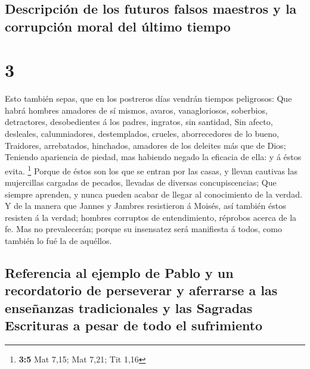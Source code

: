 \hypertarget{descripciuxf3n-de-los-futuros-falsos-maestros-y-la-corrupciuxf3n-moral-del-uxfaltimo-tiempo}{%
\subsection{Descripción de los futuros falsos maestros y la corrupción
moral del último
tiempo}\label{descripciuxf3n-de-los-futuros-falsos-maestros-y-la-corrupciuxf3n-moral-del-uxfaltimo-tiempo}}

\hypertarget{section-2}{%
\section{3}\label{section-2}}

 Esto también sepas, que en los postreros días vendrán
tiempos peligrosos:  Que habrá hombres amadores de sí
mismos, avaros, vanagloriosos, soberbios, detractores, desobedientes á
los padres, ingratos, sin santidad,  Sin afecto,
desleales, calumniadores, destemplados, crueles, aborrecedores de lo
bueno,  Traidores, arrebatados, hinchados, amadores de los
deleites más que de Dios;  Teniendo apariencia de piedad,
mas habiendo negado la eficacia de ella: y á éstos evita. \footnote{\textbf{3:5}
  Mat 7,15; Mat 7,21; Tit 1,16}  Porque de éstos son los
que se entran por las casas, y llevan cautivas las mujercillas cargadas
de pecados, llevadas de diversas concupiscencias;  Que
siempre aprenden, y nunca pueden acabar de llegar al conocimiento de la
verdad.  Y de la manera que Jannes y Jambres resistieron á
Moisés, así también éstos resisten á la verdad; hombres corruptos de
entendimiento, réprobos acerca de la fe.  Mas no
prevalecerán; porque su insensatez será manifiesta á todos, como también
lo fué la de aquéllos.

\hypertarget{referencia-al-ejemplo-de-pablo-y-un-recordatorio-de-perseverar-y-aferrarse-a-las-enseuxf1anzas-tradicionales-y-las-sagradas-escrituras-a-pesar-de-todo-el-sufrimiento}{%
\subsection{Referencia al ejemplo de Pablo y un recordatorio de
perseverar y aferrarse a las enseñanzas tradicionales y las Sagradas
Escrituras a pesar de todo el
sufrimiento}\label{referencia-al-ejemplo-de-pablo-y-un-recordatorio-de-perseverar-y-aferrarse-a-las-enseuxf1anzas-tradicionales-y-las-sagradas-escrituras-a-pesar-de-todo-el-sufrimiento}}

